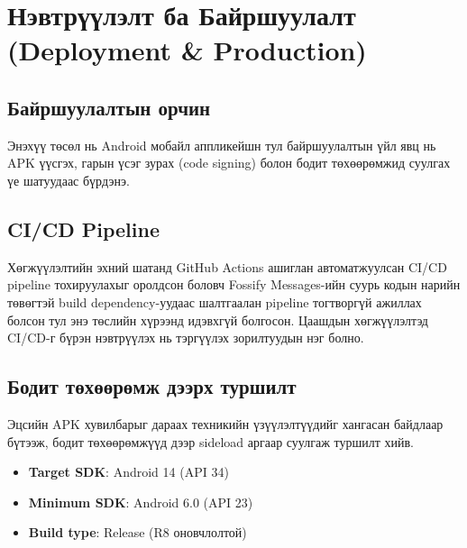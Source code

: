 \section{Нэвтрүүлэлт ба Байршуулалт (Deployment \& Production)}

\subsection{Байршуулалтын орчин}
Энэхүү төсөл нь Android мобайл аппликейшн тул
байршуулалтын үйл явц нь APK үүсгэх, гарын үсэг зурах
(code signing) болон бодит төхөөрөмжид суулгах
үе шатуудаас бүрдэнэ.

\subsection{CI/CD Pipeline}
Хөгжүүлэлтийн эхний шатанд GitHub Actions ашиглан
автоматжуулсан CI/CD pipeline тохируулахыг оролдсон боловч
Fossify Messages-ийн суурь кодын нарийн төвөгтэй
build dependency-уудаас шалтгаалан pipeline тогтворгүй
ажиллах болсон тул энэ төслийн хүрээнд идэвхгүй болгосон.
Цаашдын хөгжүүлэлтэд CI/CD-г бүрэн нэвтрүүлэх нь
тэргүүлэх зорилтуудын нэг болно.

\subsection{Бодит төхөөрөмж дээрх туршилт}
Эцсийн APK хувилбарыг дараах техникийн үзүүлэлтүүдийг
хангасан байдлаар бүтээж, бодит төхөөрөмжүүд дээр
sideload аргаар суулгаж туршилт хийв.

\begin{itemize}
    \item \textbf{Target SDK}: Android 14 (API 34)
    \item \textbf{Minimum SDK}: Android 6.0 (API 23)
    \item \textbf{Build type}: Release (R8 оновчлолтой)
\end{itemize}

\begin{table}[H]
    \centering
    \caption{Бодит төхөөрөмж дээрх туршилтын үр дүн}
    \label{table:device_test}
\end{table}


